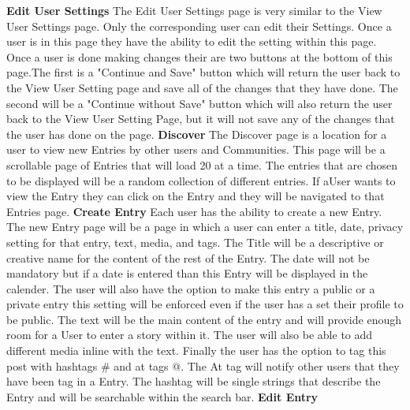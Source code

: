 \documentclass[letterpaper, 10, draftclsnofoot, onecolumn]{IEEEtran}
\begin{document}
\noindent \textbf{Edit User Settings}
\newline
\indent The Edit User Settings page is very similar to the View User Settings page. Only the corresponding user can edit their Settings. Once a user is in this page they have the ability to edit the setting within this page. Once a user is done making changes their are two buttons at the bottom of this page.The first is a "Continue and Save" button which will return the user back to the View User Setting page and save all of the changes that they have done. The second will be a "Continue without Save" button which will also return the user back to the View User Setting Page, but it will not save any of the changes that the user has done on the page.
\newline
\newline
\textbf{Discover}
\newline 
\indent The Discover page is a location for a user to view new Entries by other users and Communities. This page will be a scrollable page of Entries that will load 20 at a time. The entries that are chosen to be displayed will be a random collection of different entries. If aUser wants to view the Entry they can click on the Entry and they will be navigated to that Entries page.
\newline
\newline
\textbf{Create Entry}
\newline
\indent Each user has the ability to create a new Entry. The new Entry page will be a page in which a user can enter a title, date, privacy setting for that entry, text, media, and tags. The Title will be a descriptive or creative name for the content of the rest of the Entry. The date will not be mandatory but if a date is entered than this Entry will be displayed in the calender. The user will also have the option to make this entry a public or a private entry this setting will be enforced even if the user has a set their profile to be public. The text will be the main content of the entry and will provide enough room for a User to enter a story within it. The user will also be able to add different media inline with the text. Finally the user has the option to tag this post with hashtags \# and at tags @. The At tag will notify other users that they have been tag in a Entry. The hashtag will be single strings that describe the Entry and will be searchable within the search bar.
\newline
\newline
\textbf{Edit Entry}
\newline
\end{document}

